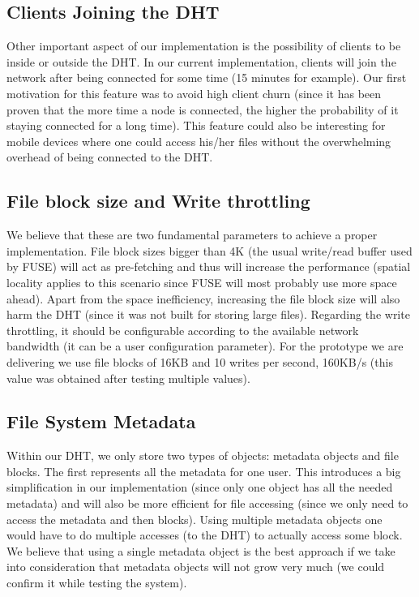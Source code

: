 \documentclass[times,9pt,article]{llncs}
\begin{document}
\subsection{Clients Joining the DHT}
Other important aspect of our implementation is the possibility of clients to be inside or outside the DHT. In our current implementation, clients will join the network after being connected for some time (15 minutes for example). Our first motivation for this feature was to avoid high client churn (since it has been proven that the more time a node is connected, the higher the probability of it staying connected for a long time). This feature could also be interesting for mobile devices where one could access his/her files without the overwhelming overhead of being connected to the DHT.

\subsection{File block size and Write throttling}
We believe that these are two fundamental parameters to achieve a proper implementation. File block sizes bigger than 4K (the usual write/read buffer used by FUSE) will act as pre-fetching and thus will increase the performance (spatial locality applies to this scenario since FUSE will most probably use more space ahead). Apart from the space inefficiency, increasing the file block size will also harm the DHT (since it was not built for storing large files). Regarding the write throttling, it should be configurable according to the available network bandwidth (it can be a user configuration parameter). For the prototype we are delivering we use file blocks of 16KB and 10 writes per second, 160KB/s (this value was obtained after testing multiple values).

\subsection{File System Metadata}
Within our DHT, we only store two types of objects: metadata objects and file blocks. The first represents all the metadata for one user. This introduces a big simplification in our implementation (since only one object has all the needed metadata) and will also be more efficient for file accessing (since we only need to access the metadata and then blocks). Using multiple metadata objects one would have to do multiple accesses (to the DHT) to actually access some block. We believe that using a single metadata object is the best approach if we take into consideration that metadata objects will not grow very much (we could confirm it while testing the system).
\end{document}

